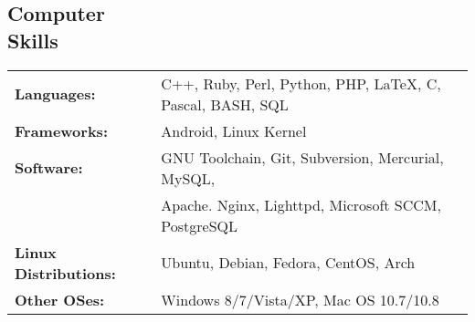 \documentclass[margin]{res}
\begin{document}
\begin{resume}
    \section{Computer \\ Skills}
      \begin{tabular}{l p{3.6in}}
        {\bf Languages:} & C++, Ruby, Perl, Python, PHP, \LaTeX, C, Pascal, BASH, SQL \\ [1pt]
        {\bf Frameworks:} & Android, Linux Kernel \\ [1pt]
        {\bf Software:} & GNU Toolchain, Git, Subversion, Mercurial, MySQL, \\
        & Apache. Nginx, Lighttpd, Microsoft SCCM, PostgreSQL \\ [1pt]
        {\bf Linux Distributions:} & Ubuntu, Debian, Fedora, CentOS, Arch \\ [1pt]
        {\bf Other OSes:} & Windows 8/7/Vista/XP, Mac OS 10.7/10.8 \\ [1pt]
      \end{tabular}

  \end{resume} 
\end{document}
